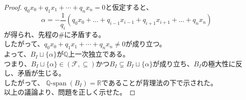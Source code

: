\documentclass{jreport}
\DeclareMathOperator{\spn}{\mathbb{Q}-span}
\begin{document}
\begin{proof}
	$q_0x_0+q_1x_1+\cdots+q_nx_n = 0$と仮定すると、\\
			$$
	\alpha = -\frac{1}{q_i}(q_0x_0+\ldots+q_{i-1}x_{i-1}+q_{i+1}x_{i+1}+\ldots+q_nx_n )
			$$
			が得られ、先程の\#に矛盾する。\\
		したがって、$q_0x_0+q_1x_1+\cdots+q_nx_n \neq 0$が成り立つ。\\
	よって、$B_I\sqcup \{\alpha\}$が$\mathbb{Q}$上一次独立である。\\
	つまり、$B_I\sqcup \{\alpha\} \in (\mathcal{F},\subseteq )$かつ$B_I \subsetneq B_I\sqcup \{\alpha\} $が成り立ち、$B_I$の極大性に反し、矛盾が生じる。\\
	したがって、$\spn{(B_I)}=\mathbb{R}$であることが背理法の下で示された。\\
	以上の議論より、問題を正しく示せた。
\end{proof}
\newpage
\end{document}
